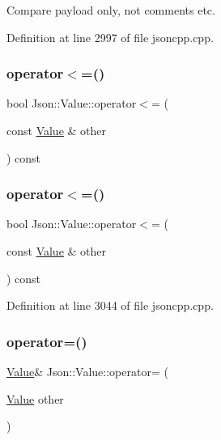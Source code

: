 Compare payload only, not comments etc. 



Definition at line 2997 of file jsoncpp.\+cpp.

\hypertarget{class_json_1_1_value_a40c411a320a416d5eac0052b36211286}{}\label{class_json_1_1_value_a40c411a320a416d5eac0052b36211286} 
\subsubsection{\texorpdfstring{operator$<$=()}{operator<=()}\hspace{0.1cm}{\footnotesize\ttfamily [1/2]}}
{\footnotesize\ttfamily bool Json\+::\+Value\+::operator$<$= (\begin{DoxyParamCaption}\item[{const \hyperlink{class_json_1_1_value}{Value} \&}]{other }\end{DoxyParamCaption}) const}

\hypertarget{class_json_1_1_value_a40c411a320a416d5eac0052b36211286}{}\label{class_json_1_1_value_a40c411a320a416d5eac0052b36211286} 
\subsubsection{\texorpdfstring{operator$<$=()}{operator<=()}\hspace{0.1cm}{\footnotesize\ttfamily [2/2]}}
{\footnotesize\ttfamily bool Json\+::\+Value\+::operator$<$= (\begin{DoxyParamCaption}\item[{const \hyperlink{class_json_1_1_value}{Value} \&}]{other }\end{DoxyParamCaption}) const}



Definition at line 3044 of file jsoncpp.\+cpp.

\hypertarget{class_json_1_1_value_a94ca5ba1f5e152d8ad280b1b54796fdc}{}\label{class_json_1_1_value_a94ca5ba1f5e152d8ad280b1b54796fdc} 
\subsubsection{\texorpdfstring{operator=()}{operator=()}\hspace{0.1cm}{\footnotesize\ttfamily [1/2]}}
{\footnotesize\ttfamily \hyperlink{class_json_1_1_value}{Value}\& Json\+::\+Value\+::operator= (\begin{DoxyParamCaption}\item[{\hyperlink{class_json_1_1_value}{Value}}]{other }\end{DoxyParamCaption})}

